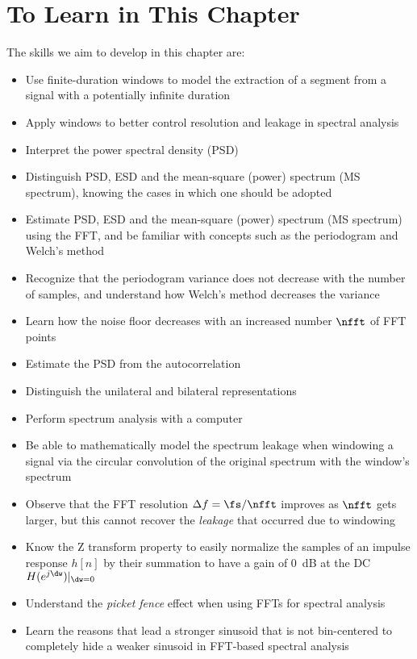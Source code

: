 \section{To Learn in This Chapter}
The skills we aim to develop in this chapter are:
\begin{itemize}
	\item Use finite-duration windows to model the extraction of a segment from a signal with a potentially infinite duration
	\item Apply windows to better control resolution and leakage in spectral analysis
	\item Interpret the power spectral density (PSD) %
	\item Distinguish PSD, ESD and the mean-square (power) spectrum (MS spectrum), knowing the cases in which one should be adopted
	\item Estimate PSD, ESD and the mean-square (power) spectrum (MS spectrum) using the FFT, and be familiar with concepts
	such as the periodogram and Welch's method
	\item Recognize that the periodogram variance does not decrease with the number of samples, and understand how Welch's method decreases the variance
	\item Learn how the noise floor decreases with an increased number $\nfft$ of FFT points
	\item Estimate the PSD from the autocorrelation
	\item Distinguish the unilateral and bilateral representations
	\item Perform spectrum analysis with a computer
	\item Be able to mathematically model the spectrum leakage when windowing a signal via the circular convolution of the original
	spectrum with the window's spectrum
	\item Observe that the FFT resolution $\Delta f = \fs / \nfft$ improves as $\nfft$ gets larger, but this cannot recover the \emph{leakage} that occurred due to windowing
	\item Know the Z transform property to easily normalize the samples of an impulse response $h[n]$ by their summation to have a gain of 0~dB at the DC $H(e^{j \dw})|_{\dw=0}$
	\item Understand the \emph{picket fence} effect when using FFTs for spectral analysis
	\item Learn the reasons that lead a stronger sinusoid that is not bin-centered to completely hide a weaker sinusoid in FFT-based spectral analysis

\end{itemize}
